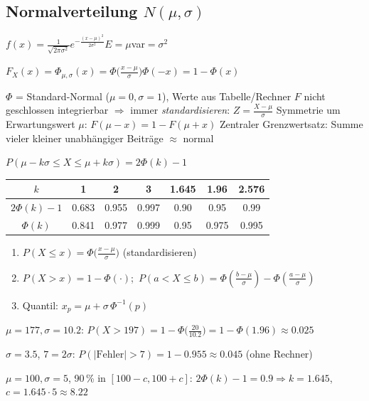 \subsection{Normalverteilung $N(\mu,\sigma)$}
\begin{formel}
$f(x)=\frac1{\sqrt{2\pi\sigma^2}}e^{-\frac{(x-\mu)^2}{2\sigma^2}}$\quad $E=\mu$\quad var$=\sigma^2$
\end{formel}
\begin{formel}
$\displaystyle F_X(x)=\Phi_{\mu,\sigma}(x)=\Phi\!\Big(\frac{x-\mu}{\sigma}\Big)$\qquad $\Phi(-x)=1-\Phi(x)$
\end{formel}
\begin{itemize}
\pfeil $\Phi$ = Standard-Normal ($\mu=0,\sigma=1$), Werte aus Tabelle/Rechner
\pfeil $F$ nicht geschlossen integrierbar $\Rightarrow$ immer \emph{standardisieren}: $Z=\frac{X-\mu}\sigma$
\pfeil Symmetrie um Erwartungswert $\mu$: $F(\mu-x)=1-F(\mu+x)$
\pfeil Zentraler Grenzwertsatz: Summe vieler kleiner unabhängiger Beiträge $\approx$ normal
\end{itemize}
\begin{formel}
$P(\mu-k\sigma\le X\le\mu+k\sigma)=2\Phi(k)-1$
\end{formel}
\begin{center}\small
\begin{tabular}{@{}c|ccc|ccc@{}}
$k$ & 1 & 2 & 3 & 1.645 & 1.96 & 2.576\\
\midrule
$2\Phi(k)-1$ & 0.683 & 0.955 & 0.997 & 0.90 & 0.95 & 0.99\\
$\Phi(k)$ & 0.841 & 0.977 & 0.999 & 0.95 & 0.975 & 0.995\\
\end{tabular}
\end{center}
\begin{merke}
\begin{enumerate}[label=\arabic*.,leftmargin=*]
\item $P(X\le x)=\Phi\big(\frac{x-\mu}\sigma\big)$ (standardisieren)
\item $P(X>x)=1-\Phi(\cdot)$;\ $P(a<X\le b)=\Phi(\tfrac{b-\mu}\sigma)-\Phi(\tfrac{a-\mu}\sigma)$
\item Quantil: $x_p=\mu+\sigma\,\Phi^{-1}(p)$
\end{enumerate}
\end{merke}
\begin{bsp}[{{Körpergrösse (4.2.5, 4.2.6)}}]
$\mu=177,\sigma=10.2$: $P(X>197)=1-\Phi\big(\frac{20}{10.2}\big)=1-\Phi(1.96)\approx0.025$
\end{bsp}
\begin{bsp}[{{Sensor (4.2.7)}}]
$\sigma=3.5$, $7=2\sigma$: $P(|\text{Fehler}|>7)=1-0.955\approx0.045$ (ohne Rechner)
\end{bsp}
\begin{bsp}[{{Abfüllung (4.2.8)}}]
$\mu=100,\sigma=5$, 90\,\% in $[100-c,100+c]$: $2\Phi(k)-1=0.9\Rightarrow k=1.645$, $c=1.645\cdot5\approx8.22$
\end{bsp}

